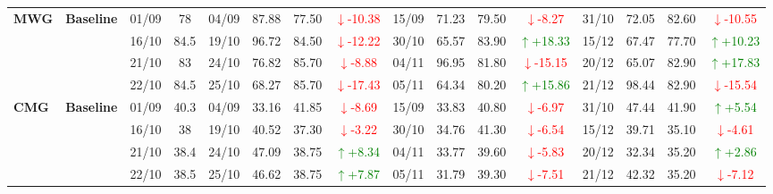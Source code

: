 \documentclass{ieeeaccess}
\begin{document}
{\begin{longtable}{llcc|cccc|cccc|cccc}
\multirow{4}{*}{\textbf{MWG}}
& \textbf{Baseline}
& 01/09 & 78 & 04/09 & 87.88 & 77.50 & \textcolor{red}{\(\downarrow\)-10.38} & 15/09 & 71.23 & 79.50 & \textcolor{red}{\(\downarrow\)-8.27} & 31/10 & 72.05 & 82.60 & \textcolor{red}{\(\downarrow\)-10.55} \\
& & 16/10 & 84.5 & 19/10 & 96.72 & 84.50 & \textcolor{red}{\(\downarrow\)-12.22} & 30/10 & 65.57 & 83.90 & \textcolor{green}{\(\uparrow\)+18.33} & 15/12 & 67.47 & 77.70 & \textcolor{green}{\(\uparrow\)+10.23} \\
& & 21/10 & 83 & 24/10 & 76.82 & 85.70 & \textcolor{red}{\(\downarrow\)-8.88} & 04/11 & 96.95 & 81.80 & \textcolor{red}{\(\downarrow\)-15.15} & 20/12 & 65.07 & 82.90 & \textcolor{green}{\(\uparrow\)+17.83} \\
& & 22/10 & 84.5 & 25/10 & 68.27 & 85.70 & \textcolor{red}{\(\downarrow\)-17.43} & 05/11 & 64.34 & 80.20 & \textcolor{green}{\(\uparrow\)+15.86} & 21/12 & 98.44 & 82.90 & \textcolor{red}{\(\downarrow\)-15.54} \\
\midrule

\multirow{4}{*}{\textbf{CMG}}
& \textbf{Baseline}
& 01/09 & 40.3 & 04/09 & 33.16 & 41.85 & \textcolor{red}{\(\downarrow\)-8.69} & 15/09 & 33.83 & 40.80 & \textcolor{red}{\(\downarrow\)-6.97} & 31/10 & 47.44 & 41.90 & \textcolor{green}{\(\uparrow\)+5.54} \\
& & 16/10 & 38 & 19/10 & 40.52 & 37.30 & \textcolor{red}{\(\downarrow\)-3.22} & 30/10 & 34.76 & 41.30 & \textcolor{red}{\(\downarrow\)-6.54} & 15/12 & 39.71 & 35.10 & \textcolor{red}{\(\downarrow\)-4.61} \\
& & 21/10 & 38.4 & 24/10 & 47.09 & 38.75 & \textcolor{green}{\(\uparrow\)+8.34} & 04/11 & 33.77 & 39.60 & \textcolor{red}{\(\downarrow\)-5.83} & 20/12 & 32.34 & 35.20 & \textcolor{green}{\(\uparrow\)+2.86} \\
& & 22/10 & 38.5 & 25/10 & 46.62 & 38.75 & \textcolor{green}{\(\uparrow\)+7.87} & 05/11 & 31.79 & 39.30 & \textcolor{red}{\(\downarrow\)-7.51} & 21/12 & 42.32 & 35.20 & \textcolor{red}{\(\downarrow\)-7.12} \\
\midrule


\end{longtable}}
\end{document}

